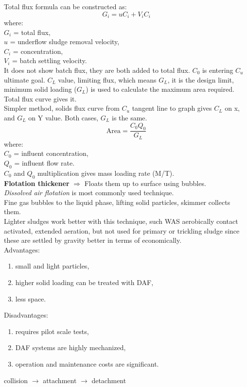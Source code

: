 \documentclass{article}
\numberwithin{equation}{section}
\begin{document}
Total flux formula can be constructed as:
\[
G_i = uC_i + V_iC_i
\]
where:\\
$G_i$ = total flux,\\
$u$ = underflow sludge removal velocity,\\
$C_i$ = concentration,\\
$V_i$ = batch settling velocity.\\
It does not show batch flux, they are both added to total flux. $C_0$ is entering $C_u$ ultimate goal. $C_L$ value, limiting flux, which means $G_L$, it is the design limit, minimum solid loading ($G_L$) is used to calculate the maximum area required. Total flux curve gives it.\\
Simpler method, solids flux curve from $C_u$ tangent line to graph gives $C_L$ on x, and $G_L$ on Y value. Both cases, $G_L$ is the same.
\[
\text{Area} = \frac{C_0Q_0}{G_L} 
\]
where:\\
$C_0$ = influent concentration,\\
$Q_0$ = influent flow rate.\\
$C_0$ and $Q_0$ multiplication gives mass loading rate (M/T).\\
\textbf{Flotation thickener} $\Rightarrow$ Floats them up to surface using bubbles.\\
\emph{Dissolved air flotation} is most commonly used technique.\\
Fine gas bubbles to the liquid phase, lifting solid particles, skimmer collects them.\\
Lighter sludges work better with this technique, such WAS aerobically contact activated, extended aeration, but not used for primary or trickling sludge since these are settled by gravity better in terms of economically.\\
Advantages:
\begin{enumerate}
    \item small and light particles,
    \item higher solid loading can be treated with DAF,
    \item less space.
\end{enumerate}
Disadvantages:
\begin{enumerate}
    \item requires pilot scale tests,
    \item DAF systems are highly mechanized,
    \item operation and maintenance costs are significant.
\end{enumerate}
collision $\rightarrow$ attachment $\rightarrow$ detachment\\
\end{document}
